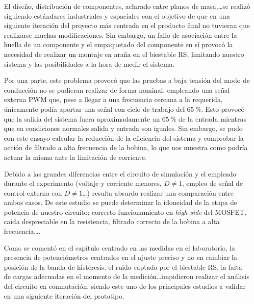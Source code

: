 \documentclass[12pt]{report} %
\begin{document}
El diseño, distribución de componentes, aclarado entre planos de masa,\dots se realizó siguiendo estándares industriales y espaciales con el objetivo de que en una siguiente iteración del proyecto más centrada en el producto final no tuvieran que realizarse muchas modificaciones. Sin embargo, un fallo de asociación entre la huella de un componente y el empaquetado del componente en sí provocó la necesidad de realizar un montaje en araña en el biestable RS, limitando nuestro sistema y las posibilidades a la hora de medir el sistema. 

Por una parte, este problema provocó que las pruebas a baja tensión del modo de conducción no se pudieran realizar de forma nominal, empleando una señal externa PWM que, pese a llegar a una frecuencia cercana a la requerida, únicamente podía aportar una señal con ciclo de trabajo del $65~\%$. Esto provocó que la salida del sistema fuera aproximadamente un $65~\%$ de la entrada mientras que en condiciones normales salida y entrada son iguales. Sin embargo, se pudo con este ensayo calcular la reducción de la eficiencia del sistema y comprobar la acción de filtrado a alta frecuencia de la bobina, lo que nos muestra como podría actuar la misma ante la limitación de corriente. 

Debido a las grandes diferencias entre el circuito de simulación y el empleado durante el experimento (voltaje y corriente menores, $D\neq1$, empleo de señal de control externa con $D\neq 1$\dots) resulta absurdo realizar una comparación entre ambos casos. De este estudio se puede determinar la idoneidad de la etapa de potencia de nuestro circuito: correcto funcionamiento en \textit{high-side} del MOSFET, caída despreciable en la resistencia, filtrado correcto de la bobina a alta frecuencia\dots.

Como se comentó en el capítulo centrado en las medidas en el laboratorio, la presencia de potenciómetros centrados en el ajuste preciso y no en cambiar la posición de la banda de histéresis, el ruido captado por el biestable RS, la falta de cargas adecuadas en el momento de la medición\dots impidieron realizar el análisis del circuito en conmutación, siendo este uno de los principales estudios a validar en una siguiente iteración del prototipo. 
\end{document}
